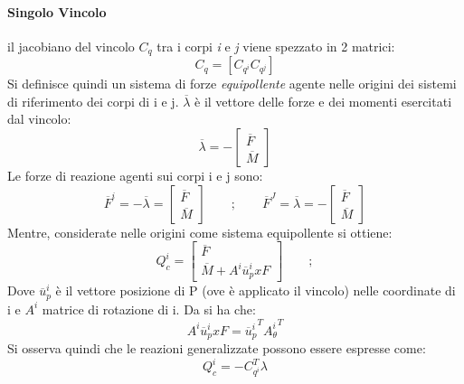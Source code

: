 \paragraph{Singolo Vincolo}
il jacobiano del vincolo $C_q$ tra i corpi \emph{i} e \emph{j} viene spezzato in 2 matrici:
\begin{equation} \label{eq:jacobian_composition}
C_q = \left[ C_{q^i} C_{q^j}\right]
\end{equation}
Si definisce quindi un sistema di forze \emph{equipollente} agente nelle origini dei sistemi di riferimento dei corpi di i e j. $\overline{\lambda}$ è il vettore delle forze e dei momenti esercitati dal vincolo:
\begin{equation} \label{eq:lambda}
\overline{\lambda} = - \begin{bmatrix} \overline{F} \\ \overline{M}
\end{bmatrix} \end{equation}
Le forze di reazione agenti sui corpi i e j sono:
\begin{equation}
\overline{F}^i = -\overline{\lambda} = 
\begin{bmatrix} \overline{F} \\ \overline{M} \end{bmatrix} \qquad ; 
\qquad \overline{F}^J = \overline{\lambda} = -\begin{bmatrix} \overline{F} \\ \overline{M} \end{bmatrix}
\end{equation}
Mentre, considerate nelle origini come sistema equipollente si ottiene:
\begin{equation}
Q^i_c = \begin{bmatrix} \overline{F} \\ \overline{M} + A^i\overline{u}^i_p x F \end{bmatrix} \qquad ; 
\end{equation}
Dove $\overline{u}^i_p$ è il vettore posizione di P (ove è applicato il vincolo) nelle coordinate di i e $A^i$ matrice di rotazione di i.
Da \cite{shabana94} si ha che:
\[A^i\overline{u}^i_p x F = {\overline{u}^i_p}^T {A_\theta^i}^T  \]
Si osserva quindi che le reazioni generalizzate possono essere espresse come:
\begin{equation}
\label{eq:lagrangemulti_to_reaction}
Q_c^i = -C^T_{q^i} \lambda
\end{equation}
